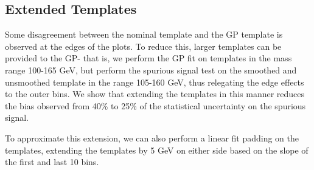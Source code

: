\subsection{Extended Templates}

Some disagreement between the nominal template and the GP template is observed at the edges of the plots. To reduce this, larger templates can be provided to the GP- that is, we perform the GP fit on templates in the mass range 100-165 GeV, but perform the spurious signal test on the smoothed and unsmoothed template in the range 105-160 GeV, thus relegating the edge effects to the outer bins. We show that extending the templates in this manner reduces the bias observed from 40\% to 25\% of the statistical uncertainty on the spurious signal.

To approximate this extension, we can also perform a linear fit padding on the templates, extending the templates by 5 GeV on either side based on the slope of the first and last 10 bins. 

